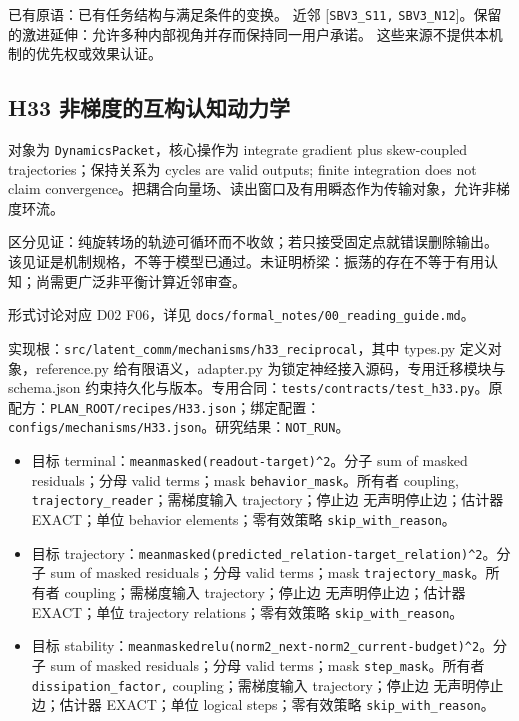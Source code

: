 \documentclass[
  10pt,
]{article}
\begin{document}
已有原语：已有任务结构与满足条件的变换。 近邻 {[}\nolinkurl{SBV3_S11,}
\nolinkurl{SBV3_N12}{]}。保留的激进延伸：允许多种内部视角并存而保持同一用户承诺。
这些来源不提供本机制的优先权或效果认证。

\subsection{H33
非梯度的互构认知动力学}\label{h33-ux975eux68afux5ea6ux7684ux4e92ux6784ux8ba4ux77e5ux52a8ux529bux5b66}

对象为 \nolinkurl{DynamicsPacket}，核心操作为 integrate gradient plus
skew-coupled trajectories；保持关系为 cycles are valid outputs; finite
integration does not claim
convergence。把耦合向量场、读出窗口及有用瞬态作为传输对象，允许非梯度环流。

区分见证：纯旋转场的轨迹可循环而不收敛；若只接受固定点就错误删除输出。
该见证是机制规格，不等于模型已通过。未证明桥梁：振荡的存在不等于有用认知；尚需更广泛非平衡计算近邻审查。

形式讨论对应 D02 F06，详见
{\small\nolinkurl{docs/formal_notes/00_reading_guide.md}}。

实现根：{\small\nolinkurl{src/latent_comm/mechanisms/h33_reciprocal}}，其中
types.py 定义对象，reference.py 给有限语义，adapter.py
为锁定神经接入源码，专用迁移模块与 schema.json
约束持久化与版本。专用合同：{\small\nolinkurl{tests/contracts/test_h33.py}}。原配方：{\small\nolinkurl{PLAN_ROOT/recipes/H33.json}}；绑定配置：{\small\nolinkurl{configs/mechanisms/H33.json}}。研究结果：\nolinkurl{NOT_RUN}。

\begin{itemize}
\item
  目标
  terminal：{\small\nolinkurl{mean}\hspace{0.333em}\nolinkurl{masked}\hspace{0.333em}\nolinkurl{(readout-target)^2}}。分子
  sum of masked residuals；分母 valid terms；mask
  \nolinkurl{behavior_mask}。所有者 coupling,
  \nolinkurl{trajectory_reader}；需梯度输入 trajectory；停止边
  无声明停止边；估计器 EXACT；单位 behavior elements；零有效策略
  \nolinkurl{skip_with_reason}。
\item
  目标
  trajectory：{\small\nolinkurl{mean}\hspace{0.333em}\nolinkurl{masked}\hspace{0.333em}\nolinkurl{(predicted_relation-target_relation)^2}}。分子
  sum of masked residuals；分母 valid terms；mask
  \nolinkurl{trajectory_mask}。所有者 coupling；需梯度输入
  trajectory；停止边 无声明停止边；估计器 EXACT；单位 trajectory
  relations；零有效策略 \nolinkurl{skip_with_reason}。
\item
  目标
  stability：{\small\nolinkurl{mean}\hspace{0.333em}\nolinkurl{masked}\hspace{0.333em}\nolinkurl{relu(norm2_next-norm2_current-budget)^2}}。分子
  sum of masked residuals；分母 valid terms；mask
  \nolinkurl{step_mask}。所有者 \nolinkurl{dissipation_factor,}
  coupling；需梯度输入 trajectory；停止边 无声明停止边；估计器
  EXACT；单位 logical steps；零有效策略 \nolinkurl{skip_with_reason}。
\end{itemize}
\end{document}
